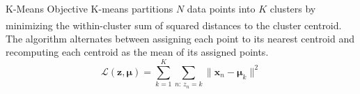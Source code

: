 \begin{v3topic}{K-Means Objective}
    K-means partitions $N$ data points into $K$ clusters by minimizing the within-cluster sum of squared distances to the cluster centroid\textsuperscript{\cite[][p.166]{iiiCourseMachineLearning}}. The algorithm alternates between assigning each point to its nearest centroid and recomputing each centroid as the mean of its assigned points.
\visualseparator
    \begin{equation}
        \mathcal{L}(\mathbf{z}, \boldsymbol{\mu}) = \sum_{k=1}^{K} \sum_{n:\, z_n = k} \|\mathbf{x}_n - \boldsymbol{\mu}_k\|^2
    \end{equation}

\end{v3topic}
